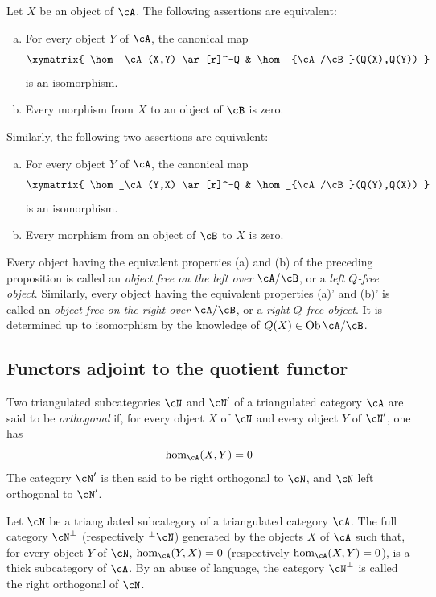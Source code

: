 \documentclass[oneside]{book}
\begin{document}
\begin{proposition}\label{VIII:2-5-3}
Let $X$ be an object of $\cA$. The following assertions are equivalent:
\begin{enumerate}[(a)]
  \item For every object $Y$ of $\cA$, the canonical map
    \[\xymatrix{
      \hom_\cA(X,Y) \ar[r]^-Q
        & \hom_{\cA/\cB}(Q(X),Q(Y))
    }\]
    is an isomorphism.
  \item Every morphism from $X$ to an object of $\cB$ is zero.
\end{enumerate}
Similarly, the following two assertions are equivalent:
\begin{enumerate}[(a)']
  \item For every object $Y$ of $\cA$, the canonical map
    \[\xymatrix{
      \hom_\cA(Y,X) \ar[r]^-Q
        & \hom_{\cA/\cB}(Q(Y),Q(X))
    }\]
    is an isomorphism.
  \item Every morphism from an object of $\cB$ to $X$ is zero.
\end{enumerate}
\end{proposition}

\begin{definition}\label{VIII:2-5-4}
Every object having the equivalent properties (a) and (b) of the preceding
proposition is called an \emph{object free on the left over $\cA/\cB$},
or a \emph{left $Q$-free object}. Similarly, every object having the
equivalent properties (a)' and (b)' is called an \emph{object free on the
right over $\cA/\cB$}, or a \emph{right $Q$-free object}. It is determined
up to isomorphism by the knowledge of
$Q(X)\in\operatorname{Ob}{\cA/\cB}$.
\end{definition}

\subsection{Functors adjoint to the quotient functor}\label{VIII:2-6}

\begin{definition}\label{VIII:2-6-1}
Two triangulated subcategories $\cN$ and $\cN'$ of a triangulated category
$\cA$ are said to be \emph{orthogonal} if, for every object $X$ of $\cN$
and every object $Y$ of $\cN'$, one has
\[
  \hom_\cA(X,Y) = 0
\]
The category $\cN'$ is then said to be right orthogonal to $\cN$, and
$\cN$ left orthogonal to $\cN'$.
\end{definition}

\begin{proposition}\label{VIII:2-6-2}
Let $\cN$ be a triangulated subcategory of a triangulated category $\cA$.
The full category $\cN^\bot$ (respectively $^\bot\cN$) generated by the
objects $X$ of $\cA$ such that, for every object $Y$ of $\cN$,
$\hom_\cA(Y,X)=0$ (respectively $\hom_\cA(X,Y)=0$), is a thick subcategory
of $\cA$. By an abuse of language, the category $\cN^\bot$ is called the
right orthogonal of $\cN$.
\end{proposition}
\end{document}
